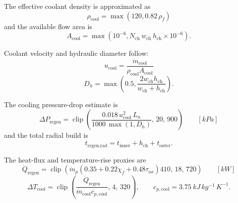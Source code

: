 \documentclass[11pt]{article}
\newcommand{\clip}{\operatorname{clip}}
\newcommand{\mdot}{\dot{m}}
\newcommand{\mdotp}{\dot{m}_{p}}
\begin{document}
The effective coolant density is approximated as
\begin{equation}
\rho_{\text{cool}}=\max(120,0.82\,\rho_f)
\label{eq:coolant-density}
\end{equation}
and the available flow area is
\begin{equation}
A_{\text{cool}}=\max\!\left(10^{-6},N_{\text{ch}}\,w_{\text{ch}}\,h_{\text{ch}}\times 10^{-6}\right).
\label{eq:coolant-area}
\end{equation}

Coolant velocity and hydraulic diameter follow:
\begin{equation}
u_{\text{cool}}=\frac{\mdot_{\text{cool}}}{\rho_{\text{cool}}A_{\text{cool}}}
\label{eq:coolant-velocity}
\end{equation}
\begin{equation}
D_h=\max\!\left(0.5,\frac{2w_{\text{ch}}h_{\text{ch}}}{w_{\text{ch}}+h_{\text{ch}}}\right).
\label{eq:hydraulic-diameter}
\end{equation}

The cooling pressure-drop estimate is
\begin{equation}
\Delta P_{\text{regen}}
=
\clip\!\left(
\frac{0.018\,u_{\text{cool}}^2\,L_n}{1000\,\max(1,D_h)},
\,
20,\,
900
\right)
\qquad [\si{kPa}]
\label{eq:regen-dp}
\end{equation}
and the total radial build is
\begin{equation}
t_{\text{regen,rad}}=t_{\text{inner}}+h_{\text{ch}}+t_{\text{outer}}.
\label{eq:regen-radial}
\end{equation}

The heat-flux and temperature-rise proxies are
\begin{equation}
\dot{Q}_{\text{regen}}
=
\clip\!\left(
\mdotp\left(0.35+0.22\chi_f+0.48\tau_{ox}\right)410,
\,
18,\,
720
\right)
\qquad [\si{kW}]
\label{eq:regen-heat}
\end{equation}
\begin{equation}
\Delta T_{\text{cool}}
=
\clip\!\left(
\frac{\dot{Q}_{\text{regen}}}{\mdot_{\text{cool}}c_{p,\text{cool}}},
\,
4,\,
320
\right),
\qquad
c_{p,\text{cool}}=3.75\ \si{kJ\,kg^{-1}\,K^{-1}}.
\label{eq:regen-dt}
\end{equation}
\end{document}
